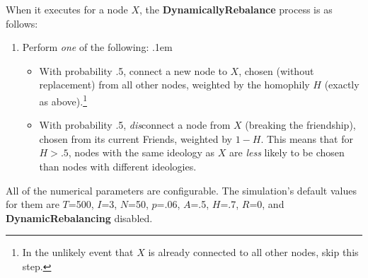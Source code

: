 When it executes for a node $X$, the \textbf{DynamicallyRebalance} process is
as follows:
\begin{enumerate}
\item Perform \textit{one} of the following:
\itemsep.1em
\begin{itemize}
\item With probability .5, connect a new node to $X$, chosen (without
replacement) from all other nodes, weighted by the homophily $H$ (exactly as
above).\footnote{In the unlikely event that $X$ is already connected to all
other nodes, skip this step.}
\item With probability .5, \textit{dis}connect a node from $X$ (breaking the
friendship), chosen from its current Friends, weighted by $1-H$. This means
that for $H>.5$, nodes with the same ideology as $X$ are \textit{less} likely
to be chosen than nodes with different ideologies.
\end{itemize}
\end{enumerate}


All of the numerical parameters are configurable. The simulation's default
values for them are $T$=500, $I$=3, $N$=50, $p$=.06, $A$=.5, $H$=.7, $R$=0,
and \textbf{DynamicRebalancing} disabled.
